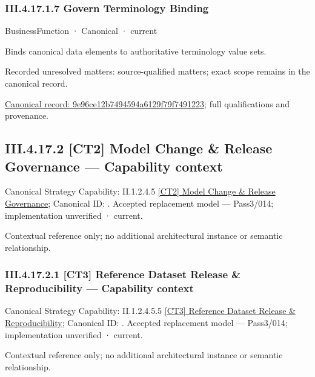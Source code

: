 \subsubsection*{III.4.17.1.7 Govern Terminology Binding}
\label{navigation:III.4.17.1.7}

\label{element:9e96ce12b7494594a6129f79f7491223}
{\small BusinessFunction · Canonical · current}\par

Binds canonical data elements to authoritative terminology value sets.


{\small Recorded unresolved matters: source-qualified matters; exact scope remains in the canonical record.}\par
{\footnotesize \href{../../../../../../../../continuum/business/business-function/9e96ce12b7494594a6129f79f7491223.md}{Canonical record: 9e96ce12b7494594a6129f79f7491223}; full qualifications and provenance.}\par
\subsection*{III.4.17.2 [CT2] Model Change \& Release Governance — Capability context}
\label{navigation:III.4.17.2}

{\small Canonical Strategy Capability: II.1.2.4.5 \hyperref[element:2eb455d8b4284a1fb175a0f1fa462cdf]{[CT2] Model Change \& Release Governance}; Canonical ID: \texttt{}. Accepted replacement model — Pass3/014; implementation unverified · current.}\par
Contextual reference only; no additional architectural instance or semantic relationship.\par
\subsubsection*{III.4.17.2.1 [CT3] Reference Dataset Release \& Reproducibility — Capability context}
\label{navigation:III.4.17.2.1}

{\small Canonical Strategy Capability: II.1.2.4.5.5 \hyperref[element:b01212ce058843b2bfee85a6d3062525]{[CT3] Reference Dataset Release \& Reproducibility}; Canonical ID: \texttt{}. Accepted replacement model — Pass3/014; implementation unverified · current.}\par
Contextual reference only; no additional architectural instance or semantic relationship.\par
